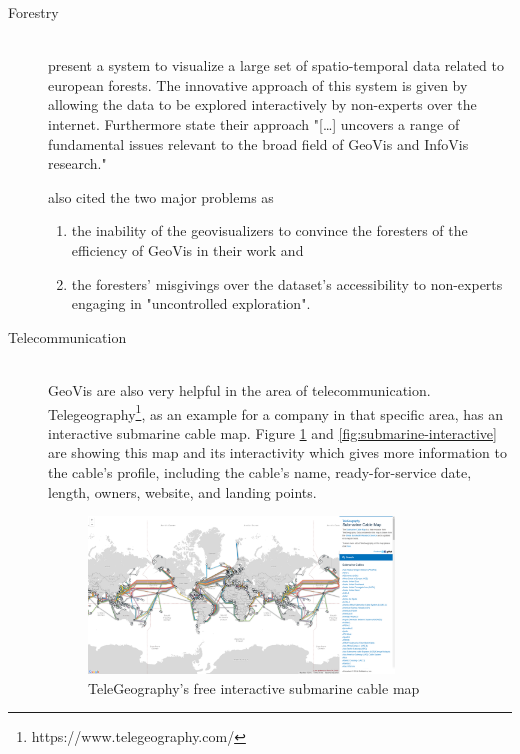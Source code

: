 \begin{description}
\item[Forestry] \hfill \\
\citeauthor{Andrienko2007} present a system to visualize a large set of spatio-temporal data related to european forests. The innovative approach of this system is given by allowing the data to be explored interactively by non-experts over the internet. Furthermore \citeauthor{Andrienko2007} state their approach "[\ldots] uncovers a range of fundamental issues relevant to the broad field of \ac{GeoVis} and \ac{InfoVis} research."

\citeauthor{Andrienko2007} also cited the two major problems as
\begin{enumerate}
\item the inability of the geovisualizers to convince the foresters of the efficiency of \ac{GeoVis} in their work and
\item the foresters' misgivings over the dataset's accessibility to non-experts engaging in "uncontrolled exploration".
\end{enumerate}

\item[Telecommunication] \hfill \\
\ac{GeoVis} are also very helpful in the area of telecommunication. Telegeography\footnote{https://www.telegeography.com/}, as an example for a company in that specific area, has an interactive submarine cable map. Figure \ref{fig:submarine} and \ref{fig:submarine-interactive} are showing this map and its interactivity which gives more information to the cable’s profile, including the cable’s name, ready-for-service date, length, owners, website, and landing points.

\begin{figure}[h]
\centering
\includegraphics[width=0.8\textwidth,keepaspectratio]{images/geovis/submarine.png}
\caption[
    TeleGeography’s free interactive submarine cable map, Urldate: 07.2016 \newline
\small\texttt{\url{http://www.submarinecablemap.com/}}
]{TeleGeography’s free interactive submarine cable map}
\label{fig:submarine}
\end{figure}


\end{description}
